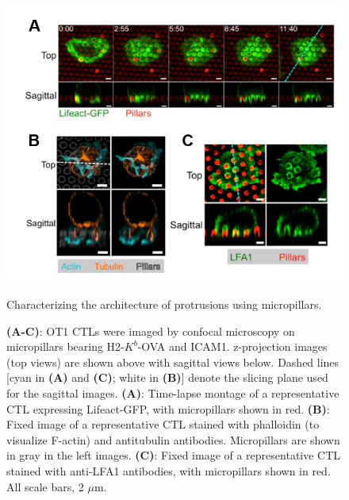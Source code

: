 \begin{figure}[htbp]
	\centering
	\includegraphics[width=\textwidth]{../figures/chapter2/fig1pillars.png}
	\caption{Characterizing the architecture of protrusions using micropillars.}
	\caption*{\textbf{(A-C)}: OT1 CTLs were imaged by confocal microscopy on micropillars bearing H2-$K^{b}$-OVA and ICAM1. z-projection images (top views) are shown above with sagittal views below. Dashed lines [cyan in \textbf{(A)} and \textbf{(C)}; white in \textbf{(B)}] denote the slicing plane used for the sagittal images. \textbf{(A)}: Time-lapse montage of a representative CTL expressing Lifeact-GFP, with micropillars shown in red. \textbf{(B)}: Fixed image of a representative CTL stained with phalloidin (to visualize F-actin) and antitubulin antibodies. Micropillars are shown in gray in the left images. \textbf{(C)}: Fixed image of a representative CTL stained with anti-LFA1 antibodies, with micropillars shown in red. All scale bars, 2 $\mu$m.}
	\label{fig:fig1pillars}
\end{figure}

